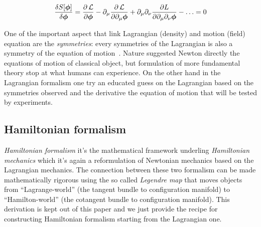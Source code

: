 \begin{equation} \label{eq:euler-lagrange-field}
  \frac{\delta S[\bm{\phi}]}{\delta \bm{\phi}} =
    \frac{\partial \operatorname{\mathcal{L}}}{\partial \bm{\phi}} -
    \partial_{\mu} \frac{\partial \operatorname{\mathcal{L}}}{\partial \partial_{\mu}\bm{\phi}} +
    \partial_{\mu}\partial_{\nu}\frac{\partial L}
    {\partial \partial_{\mu}\partial_{\nu}\bm{\phi}} -
    \ldots = 0
\end{equation}

One of the important aspect that link Lagrangian (density) and motion (field)
equation are the \emph{symmetries}: every symmetries of the Lagrangian is also a
symmetry of the equation of motion~\cite{Aldrovandi19_symmetry}. Nature
suggested Newton directly the equations of motion of classical object, but
formulation of more fundamental theory stop at what humans can experience. On
the other hand in the Lagrangian formalism one try an educated guess on the
Lagrangian based on the symmetries observed and the derivative the equation of
motion that will be tested by experiments.


\subsection{Hamiltonian formalism}\label{subsection: hamiltonian_formalism}
\emph{Hamiltonian formalism} it's the mathematical framework underling
\emph{Hamiltonian mechanics} which it's again a reformulation of Newtonian
mechanics based on the Lagrangian mechanics. The connection between these two
formalism can be made mathematically rigorous using the so called \emph{Legendre
map} that moves objects from ``Lagrange-world'' (the tangent bundle to
configuration manifold) to ``Hamilton-world'' (the cotangent bundle to
configuration manifold). This derivation is kept out of this paper and we just
provide the recipe for constructing Hamiltonian formalism starting from the
Lagrangian one.

